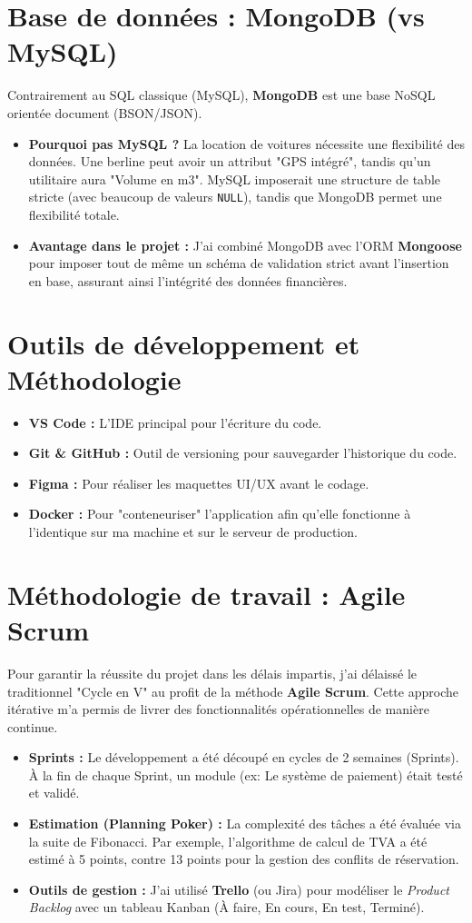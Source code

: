 \documentclass[12pt, a4paper]{report}
\begin{document}
\section{Base de données : MongoDB (vs MySQL)}
Contrairement au SQL classique (MySQL), \textbf{MongoDB} est une base NoSQL orientée document (BSON/JSON). 
\begin{itemize}
    \item \textbf{Pourquoi pas MySQL ?} La location de voitures nécessite une flexibilité des données. Une berline peut avoir un attribut "GPS intégré", tandis qu'un utilitaire aura "Volume en m3". MySQL imposerait une structure de table stricte (avec beaucoup de valeurs \texttt{NULL}), tandis que MongoDB permet une flexibilité totale.
    \item \textbf{Avantage dans le projet :} J'ai combiné MongoDB avec l'ORM \textbf{Mongoose} pour imposer tout de même un schéma de validation strict avant l'insertion en base, assurant ainsi l'intégrité des données financières.
\end{itemize}

\section{Outils de développement et Méthodologie}
\begin{itemize}
    \item \textbf{VS Code :} L'IDE principal pour l'écriture du code.
    \item \textbf{Git \& GitHub :} Outil de versioning pour sauvegarder l'historique du code.
    \item \textbf{Figma :} Pour réaliser les maquettes UI/UX avant le codage.
    \item \textbf{Docker :} Pour "conteneuriser" l'application afin qu'elle fonctionne à l'identique sur ma machine et sur le serveur de production.
\end{itemize}

\section{Méthodologie de travail : Agile Scrum}
Pour garantir la réussite du projet dans les délais impartis, j'ai délaissé le traditionnel "Cycle en V" au profit de la méthode \textbf{Agile Scrum}. Cette approche itérative m'a permis de livrer des fonctionnalités opérationnelles de manière continue.
\begin{itemize}
    \item \textbf{Sprints :} Le développement a été découpé en cycles de 2 semaines (Sprints). À la fin de chaque Sprint, un module (ex: Le système de paiement) était testé et validé.
    \item \textbf{Estimation (Planning Poker) :} La complexité des tâches a été évaluée via la suite de Fibonacci. Par exemple, l'algorithme de calcul de TVA a été estimé à 5 points, contre 13 points pour la gestion des conflits de réservation.
    \item \textbf{Outils de gestion :} J'ai utilisé \textbf{Trello} (ou Jira) pour modéliser le \textit{Product Backlog} avec un tableau Kanban (À faire, En cours, En test, Terminé).
\end{itemize}
\end{document}
